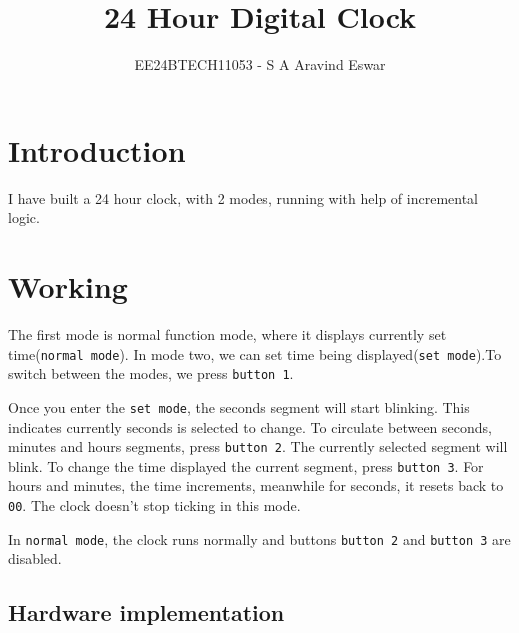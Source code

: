 \documentclass[journal]{IEEEtran}
\begin{document}

\vspace{3cm}

\title{24 Hour Digital Clock}

\author{EE24BTECH11053 - S A Aravind Eswar}
{\let\newpage\relax\maketitle}

\renewcommand{\thefigure}{\theenumi}
\renewcommand{\thetable}{\theenumi}

\section{Introduction}

I have built a 24 hour clock, with 2 modes, running with help of incremental logic. 

\section{Working}

The first mode is normal function mode, where it displays currently set time(\texttt{normal mode}). In mode two, we can set time being displayed(\texttt{set mode}).To switch between the modes, we press \texttt{button 1}. 

Once you enter the \texttt{set mode}, the seconds segment will start blinking. This indicates currently seconds is selected to change. To circulate between seconds, minutes and hours segments, press \texttt{button 2}. The currently selected segment will blink. To change the time displayed the current segment, press \texttt{button 3}. For hours and minutes, the time increments, meanwhile for seconds, it resets back to \texttt{00}. The clock doesn't stop ticking in this mode.

In \texttt{normal mode}, the clock runs normally and buttons \texttt{button 2} and \texttt{button 3} are disabled.

\subsection{Hardware implementation}
\end{document}

